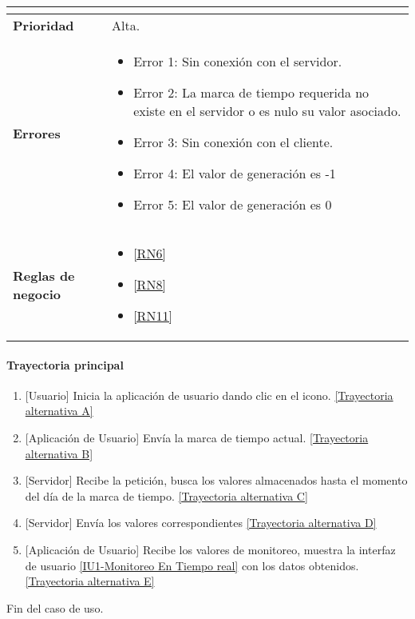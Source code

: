 \begin{longtable}{|J{5cm}|J{10.3cm}|}
\begin{itemize}
		\end{itemize} \\ \hline 
	\textbf{Prioridad} & 
		Alta. \\ \hline
	\textbf{Errores} & 
		\begin{itemize}
		    \item \label{CU5:Error1} Error 1: Sin conexión con el servidor.
			\item \label{CU5:Error2} Error 2: La marca de tiempo requerida no existe en el servidor o es nulo su valor asociado.
		    \item \label{CU5:Error3} Error 3: Sin conexión con el cliente.
		    \item \label{CU5:Error4} Error 4: El valor de generación es -1
		    \item \label{CU5:Error5} Error 5: El valor de generación es 0
		\end{itemize} \\ \hline
	\textbf{Reglas de negocio} & 
		\begin{itemize}
		    \item \ref{RN6}
			\item \ref{RN8}
			\item \ref{RN11}
		\end{itemize} \\ \hline

\end{longtable}

\paragraph{Trayectoria principal}
    \label{SUB-U-CU1.5:TP}
	\begin{enumerate}
	    \item {[Usuario]} Inicia la aplicación de usuario dando clic en el icono. \hyperref[SUB-U-CU1.5:TA]{[Trayectoria alternativa A]}
	    \item {[Aplicación de Usuario]} Envía la marca de tiempo actual. \hyperref[SUB-U-CU1.5:TB]{[Trayectoria alternativa B]} 
	    \item {[Servidor]} Recibe la petición, busca los valores almacenados hasta el momento del día de la marca de tiempo. \hyperref[SUB-U-CU1.5:TC]{[Trayectoria alternativa C]}
	    \item {[Servidor]} Envía los valores correspondientes \hyperref[SUB-U-CU1.5:TD]{[Trayectoria alternativa D]} 
	    \item {[Aplicación de Usuario]} Recibe los valores de monitoreo, muestra la interfaz de usuario \hyperref[fig:monitoreo]{[IU1-Monitoreo En Tiempo real]} con los datos obtenidos. \hyperref[SUB-U-CU1.5:TE]{[Trayectoria alternativa E]}
	\end{enumerate}
	Fin del caso de uso.

